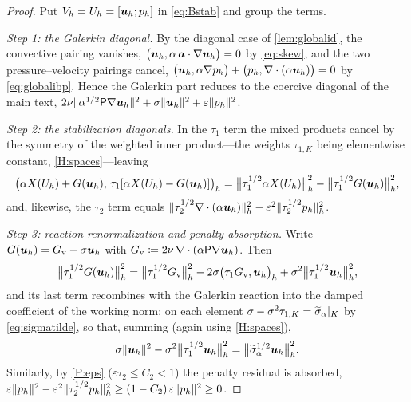\begin{proof}
Put $V_h=U_h=[\boldsymbol{u}_h;p_h]$ in \eqref{eq:Bstab} and group the terms.

\medskip\noindent\emph{Step 1: the Galerkin diagonal.}
By the diagonal case of \cref{lem:globalid}, the convective pairing vanishes,
$\bigl(\boldsymbol{u}_h,\alpha\,\boldsymbol{a}\cdot\nabla\boldsymbol{u}_h\bigr)=0$ by \eqref{eq:skew}, and the two
pressure--velocity pairings cancel,
$\bigl(\boldsymbol{u}_h,\alpha\nabla p_h\bigr)+\bigl(p_h,\nabla\cdot(\alpha\boldsymbol{u}_h)\bigr)=0$ by
\eqref{eq:globalibp}. Hence the Galerkin part reduces to the coercive diagonal of the main
text,
$2\nu\lVert\alpha^{1/2}\mathsf{P}\nabla\boldsymbol{u}_h\rVert^2+\sigma\lVert\boldsymbol{u}_h\rVert^2+\varepsilon\lVert p_h\rVert^2$.

\medskip\noindent\emph{Step 2: the stabilization diagonals.}
In the $\tau_1$ term the mixed products cancel by the symmetry of the weighted inner
product---the weights $\tau_{1,K}$ being elementwise constant, \cref{H:spaces}---leaving
\begin{equation}\label{eq:stabdiag1}
  \bigl(\alpha X(U_h)+G(\boldsymbol{u}_h),\,\tau_1[\alpha X(U_h)-G(\boldsymbol{u}_h)]\bigr)_h
  = \bigl\lVert\tau_1^{1/2}\alpha X(U_h)\bigr\rVert_h^2
  - \bigl\lVert\tau_1^{1/2}G(\boldsymbol{u}_h)\bigr\rVert_h^2 ,
\end{equation}
and, likewise, the $\tau_2$ term equals
$\lVert\tau_2^{1/2}\nabla\cdot(\alpha\boldsymbol{u}_h)\rVert_h^2
-\varepsilon^2\lVert\tau_2^{1/2}p_h\rVert_h^2$.

\medskip\noindent\emph{Step 3: reaction renormalization and penalty absorption.}
Write $G(\boldsymbol{u}_h)=G_{\mathrm v}-\sigma\boldsymbol{u}_h$ with
$G_{\mathrm v}\coloneqq 2\nu\,\nabla\cdot(\alpha\mathsf{P}\nabla\boldsymbol{u}_h)$. Then
\begin{equation}\label{eq:Gexpand}
  \bigl\lVert\tau_1^{1/2}G(\boldsymbol{u}_h)\bigr\rVert_h^2
  = \bigl\lVert\tau_1^{1/2}G_{\mathrm v}\bigr\rVert_h^2
  - 2\sigma\bigl(\tau_1 G_{\mathrm v},\boldsymbol{u}_h\bigr)_h
  + \sigma^2\bigl\lVert\tau_1^{1/2}\boldsymbol{u}_h\bigr\rVert_h^2 ,
\end{equation}
and its last term recombines with the Galerkin reaction into the damped coefficient of the
working norm: on each element $\sigma-\sigma^2\tau_{1,K}=\widetilde{\sigma}_{\alpha}|_K$ by
\eqref{eq:sigmatilde}, so that, summing (again using \cref{H:spaces}),
\begin{equation}\label{eq:reactrenorm}
  \sigma\lVert\boldsymbol{u}_h\rVert^2-\sigma^2\bigl\lVert\tau_1^{1/2}\boldsymbol{u}_h\bigr\rVert_h^2
  = \bigl\lVert\widetilde{\sigma}_{\alpha}^{1/2}\boldsymbol{u}_h\bigr\rVert_h^2 .
\end{equation}
Similarly, by \ref{P:eps} ($\varepsilon\tau_2\le C_2<1$) the penalty residual is absorbed,
$\varepsilon\lVert p_h\rVert^2-\varepsilon^2\lVert\tau_2^{1/2}p_h\rVert_h^2
\ge (1-C_2)\,\varepsilon\lVert p_h\rVert^2\ge 0$.


\end{proof}
